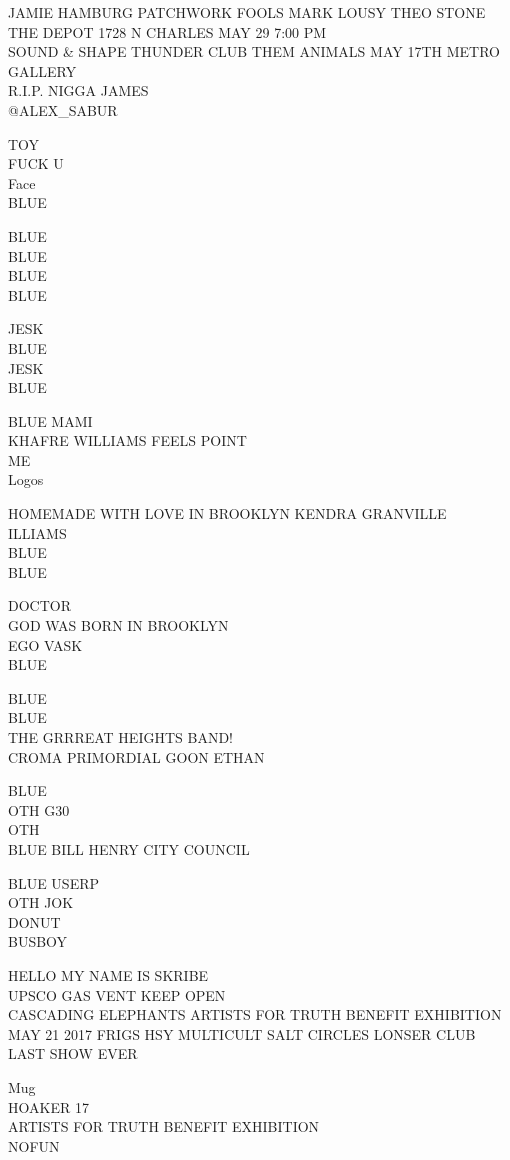 \documentclass[10pt,letterpaper]{article}
\begin{document}
JAMIE HAMBURG PATCHWORK FOOLS MARK LOUSY THEO STONE THE DEPOT 1728 N CHARLES MAY 29 7:00 PM\\
SOUND \& SHAPE THUNDER CLUB THEM ANIMALS MAY 17TH METRO GALLERY\\
R.I.P. NIGGA JAMES\\
@ALEX\_SABUR

TOY\\
FUCK U\\
Face\\
BLUE

BLUE\\
BLUE\\
BLUE\\
BLUE

JESK\\
BLUE\\
JESK\\
BLUE

BLUE MAMI\\
KHAFRE WILLIAMS FEELS POINT\\
ME\\
Logos

HOMEMADE WITH LOVE IN BROOKLYN KENDRA GRANVILLE\\
ILLIAMS\\
BLUE\\
BLUE

DOCTOR\\
GOD WAS BORN IN BROOKLYN\\
EGO VASK\\
BLUE

BLUE\\
BLUE\\
THE GRRREAT HEIGHTS BAND!\\
CROMA PRIMORDIAL GOON ETHAN

BLUE\\
OTH G30\\
OTH\\
BLUE BILL HENRY CITY COUNCIL

BLUE USERP\\
OTH JOK\\
DONUT\\
BUSBOY

HELLO MY NAME IS SKRIBE\\
UPSCO GAS VENT KEEP OPEN\\
CASCADING ELEPHANTS ARTISTS FOR TRUTH BENEFIT EXHIBITION\\
MAY 21 2017 FRIGS HSY MULTICULT SALT CIRCLES LONSER CLUB LAST SHOW EVER

Mug\\
HOAKER 17\\
ARTISTS FOR TRUTH BENEFIT EXHIBITION\\
NOFUN
\end{document}
